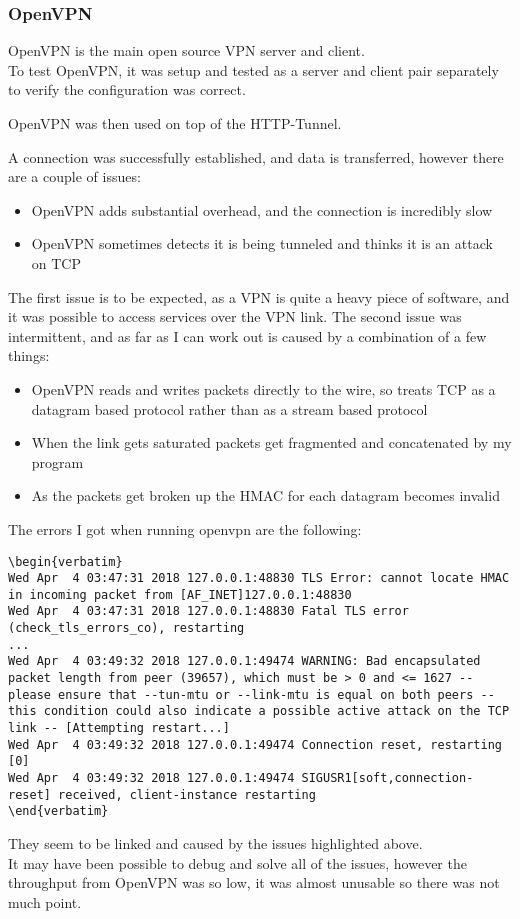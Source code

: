 \subsubsection{OpenVPN}
OpenVPN is the main open source VPN server and client.\\
To test OpenVPN, it was setup and tested as a server and client pair separately to verify the configuration was correct.\par
OpenVPN was then used on top of the HTTP-Tunnel.\par
A connection was successfully established, and data is transferred, however there are a couple of issues:
\begin{itemize}
    \item OpenVPN adds substantial overhead, and the connection is incredibly slow
    \item OpenVPN sometimes detects it is being tunneled and thinks it is an attack on TCP
\end{itemize}
The first issue is to be expected, as a VPN is quite a heavy piece of software, and it was possible to access services over the VPN link.
The second issue was intermittent, and as far as I can work out is caused by a combination of a few things:
\begin{itemize}
    \item OpenVPN reads and writes packets directly to the wire, so treats TCP as a datagram based protocol rather than as a stream based protocol
    \item When the link gets saturated packets get fragmented and concatenated by my program
    \item As the packets get broken up the HMAC for each datagram becomes invalid
\end{itemize}
The errors I got when running openvpn are the following:
\begin{lstlisting}[language=none,numbers=none,firstline=2,lastline=7]
\begin{verbatim}
Wed Apr  4 03:47:31 2018 127.0.0.1:48830 TLS Error: cannot locate HMAC in incoming packet from [AF_INET]127.0.0.1:48830
Wed Apr  4 03:47:31 2018 127.0.0.1:48830 Fatal TLS error (check_tls_errors_co), restarting
...
Wed Apr  4 03:49:32 2018 127.0.0.1:49474 WARNING: Bad encapsulated packet length from peer (39657), which must be > 0 and <= 1627 -- please ensure that --tun-mtu or --link-mtu is equal on both peers -- this condition could also indicate a possible active attack on the TCP link -- [Attempting restart...]
Wed Apr  4 03:49:32 2018 127.0.0.1:49474 Connection reset, restarting [0]
Wed Apr  4 03:49:32 2018 127.0.0.1:49474 SIGUSR1[soft,connection-reset] received, client-instance restarting
\end{verbatim}
\end{lstlisting}
They seem to be linked and caused by the issues highlighted above.\\
It may have been possible to debug and solve all of the issues, however the throughput from OpenVPN was so low, it was almost unusable so there was not much point.

